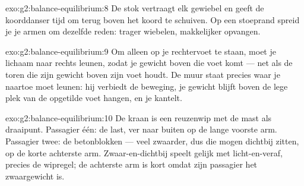 \begin{solution}{exo:g2:balance-equilibrium:8}
De stok vertraagt elk gewiebel en geeft de koorddanser tijd om terug
boven het koord te schuiven. Op een stoeprand spreid je je armen om
dezelfde reden: trager wiebelen, makkelijker opvangen.
\end{solution}

\begin{solution}{exo:g2:balance-equilibrium:9}
Om alleen op je rechtervoet te staan, moet je lichaam naar rechts
leunen, zodat je gewicht boven die voet komt --- net als de toren die
zijn gewicht boven zijn voet houdt. De muur staat precies waar je
naartoe moet leunen: hij verbiedt de beweging, je gewicht blijft boven
de lege plek van de opgetilde voet hangen, en je kantelt.
\end{solution}

\begin{solution}{exo:g2:balance-equilibrium:10}
De kraan is een reuzenwip met de mast als draaipunt. Passagier één: de
last, ver naar buiten op de lange voorste arm. Passagier twee: de
betonblokken --- veel zwaarder, dus die mogen dichtbij zitten, op de
korte achterste arm. Zwaar-en-dichtbij speelt gelijk met
licht-en-veraf, precies de wipregel; de achterste arm is kort omdat
zijn passagier het zwaargewicht is.
\end{solution}
